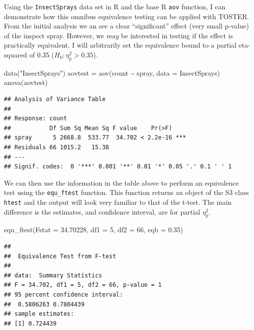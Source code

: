 \documentclass[]{interact}
\theoremstyle{plain}%
\theoremstyle{definition}
\theoremstyle{remark}
\newenvironment{Shaded}{\begin{snugshade}}{\end{snugshade}}
\newcommand{\AttributeTok}[1]{\textcolor[rgb]{0.77,0.63,0.00}{#1}}
\newcommand{\DecValTok}[1]{\textcolor[rgb]{0.00,0.00,0.81}{#1}}
\newcommand{\FloatTok}[1]{\textcolor[rgb]{0.00,0.00,0.81}{#1}}
\newcommand{\FunctionTok}[1]{\textcolor[rgb]{0.00,0.00,0.00}{#1}}
\newcommand{\NormalTok}[1]{#1}
\newcommand{\OtherTok}[1]{\textcolor[rgb]{0.56,0.35,0.01}{#1}}
\newcommand{\SpecialCharTok}[1]{\textcolor[rgb]{0.00,0.00,0.00}{#1}}
\newcommand{\StringTok}[1]{\textcolor[rgb]{0.31,0.60,0.02}{#1}}
\begin{document}
Using the \texttt{InsectSprays} data set in R and the base R
\texttt{aov} function, I can demonstrate how this omnibus equivalence
testing can be applied with TOSTER. From the initial analysis we an see
a clear ``significant'' effect (very small p-value) of the inspect
spray. However, we \emph{may} be interested in testing if the effect is
practically equivalent. I will arbitrarily set the equivalence bound to
a partial eta-squared of 0.35 (\(H_0: \eta^2_p > 0.35\)).

\begin{Shaded}
\begin{Highlighting}[]
\FunctionTok{data}\NormalTok{(}\StringTok{"InsectSprays"}\NormalTok{)}
\NormalTok{aovtest }\OtherTok{=} \FunctionTok{aov}\NormalTok{(count }\SpecialCharTok{\textasciitilde{}}\NormalTok{ spray, }\AttributeTok{data =}\NormalTok{ InsectSprays)}
\FunctionTok{anova}\NormalTok{(aovtest)}
\end{Highlighting}
\end{Shaded}

\begin{verbatim}
## Analysis of Variance Table
## 
## Response: count
##           Df Sum Sq Mean Sq F value    Pr(>F)    
## spray      5 2668.8  533.77  34.702 < 2.2e-16 ***
## Residuals 66 1015.2   15.38                      
## ---
## Signif. codes:  0 '***' 0.001 '**' 0.01 '*' 0.05 '.' 0.1 ' ' 1
\end{verbatim}

We can then use the information in the table above to perform an
equivalence test using the \texttt{equ\_ftest} function. This function
returns an object of the S3 class \texttt{htest} and the output will
look very familiar to that of the t-test. The main difference is the
estimates, and confidence interval, are for partial \(\eta^2_p\).

\begin{Shaded}
\begin{Highlighting}[]
\FunctionTok{equ\_ftest}\NormalTok{(}\AttributeTok{Fstat =} \FloatTok{34.70228}\NormalTok{,  }\AttributeTok{df1 =} \DecValTok{5}\NormalTok{, }\AttributeTok{df2 =} \DecValTok{66}\NormalTok{,  }\AttributeTok{eqb =} \FloatTok{0.35}\NormalTok{)}
\end{Highlighting}
\end{Shaded}

\begin{verbatim}
## 
##  Equivalence Test from F-test
## 
## data:  Summary Statistics
## F = 34.702, df1 = 5, df2 = 66, p-value = 1
## 95 percent confidence interval:
##  0.5806263 0.7804439
## sample estimates:
## [1] 0.724439
\end{verbatim}
\end{document}
